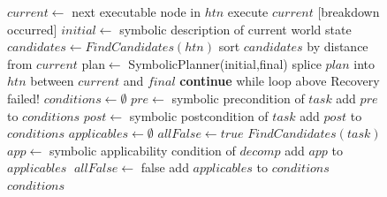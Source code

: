 \documentclass[a4paper,twoside,french]{article}
\begin{document}
		\begin{figure}[t]
		
			\begin{algorithmic}[1]\small
				
				\State $current\gets$ next executable node in $htn$
				 execute $current$
				\Else\hskip 0.1in [breakdown occurred]
				\State $initial\gets$ symbolic description of current world state
				\State $candidates\gets FindCandidates(htn)$
				\State sort $candidates$ by distance from $current$
				\State plan$\gets$ SymbolicPlanner(initial,final)
				\State splice $plan$ into $htn$ between $current$ and $final$
				\State \textbf{continue} while loop above
				\EndIf
				\EndFor
				\State Recovery failed!
				\EndIf
				\EndWhile
				\EndProcedure
				\Statex
				\State $conditions\gets\emptyset$
				\State $pre\gets$ symbolic precondition of $task$
				\State add $pre$ to $conditions$\EndIf
				\State $post\gets$ symbolic postcondition of $task$
				\State add $post$ to $conditions$
				\EndIf
				\State $applicables\gets\emptyset$
				\State $allFalse\gets true$
				 $FindCandidates(task)$
				\EndFor 
				\State $app\gets$ symbolic applicability condition of $decomp$
				 add $app$ to $applicables$\EndIf
				\Else $\;allFalse\gets$ false
				\EndIf 
				\EndIf
				\EndFor
				 add $applicables$ to $conditions$
				\EndIf
				\State\Return $conditions$
				\EndProcedure 
				
			\end{algorithmic}
			\vskip 8pt
		\end{figure} 
\end{document}
